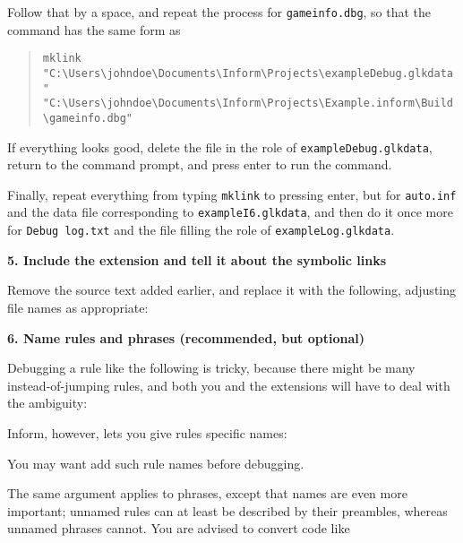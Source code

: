 \documentclass{book}
\newcommand{\lastpagebreak}{\vfill\pagebreak}
\begin{document}
Follow that by a space, and repeat the process for \texttt{gameinfo.dbg}, so
that the command has the same form as

\begin{quote}
  \lstinline{mklink "C:\Users\johndoe\Documents\Inform\Projects\exampleDebug.glkdata" "C:\Users\johndoe\Documents\Inform\Projects\Example.inform\Build\gameinfo.dbg"}
\end{quote}

If everything looks good, delete the file in the role of
\texttt{exampleDebug.glkdata}, return to the command prompt, and press enter to
run the command.

Finally, repeat everything from typing \texttt{mklink} to pressing enter, but
for \texttt{auto.inf} and the data file corresponding to
\texttt{exampleI6.glkdata}, and then do it once more for \texttt{Debug log.txt}
and the file filling the role of \texttt{exampleLog.glkdata}.

\textbf{5. Include the extension and tell it about the symbolic links}

Remove the source text added earlier, and replace it with the following,
adjusting file names as appropriate:

\begin{quote}
  
\end{quote}

\textbf{6. Name rules and phrases (recommended, but optional)}

Debugging a rule like the following is tricky, because there might be many
instead-of-jumping rules, and both you and the extensions will have to deal with
the ambiguity:

\begin{quote}
  
\end{quote}

Inform, however, lets you give rules specific names:

\begin{quote}
  
\end{quote}

You may want add such rule names before debugging.

\lastpagebreak

The same argument applies to phrases, except that names are even more important;
unnamed rules can at least be described by their preambles, whereas unnamed
phrases cannot.  You are advised to convert code like

\begin{quote}
  
\end{quote}
\end{document}
